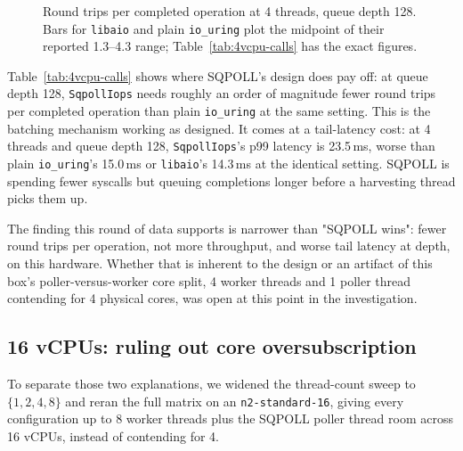 \documentclass[conference]{IEEEtran}
\begin{document}
\begin{figure}[t]
\centering
{}
\caption{Round trips per completed operation at 4 threads, queue depth 128. Bars for
\texttt{libaio} and plain \texttt{io\_uring} plot the midpoint of their reported 1.3--4.3 range;
Table~\ref{tab:4vcpu-calls} has the exact figures.}
\label{fig:calls-per-op}
\end{figure}

Table~\ref{tab:4vcpu-calls} shows where SQPOLL's design does pay off: at queue depth 128,
\texttt{SqpollIops} needs roughly an order of magnitude fewer round trips per completed
operation than plain \texttt{io\_uring} at the same setting. This is the batching mechanism
working as designed. It comes at a tail-latency cost: at 4 threads and queue depth 128,
\texttt{SqpollIops}'s p99 latency is 23.5\,ms, worse than plain \texttt{io\_uring}'s 15.0\,ms or
\texttt{libaio}'s 14.3\,ms at the identical setting. SQPOLL is spending fewer syscalls but
queuing completions longer before a harvesting thread picks them up.

The finding this round of data supports is narrower than "SQPOLL wins": fewer round trips per
operation, not more throughput, and worse tail latency at depth, on this hardware. Whether that
is inherent to the design or an artifact of this box's poller-versus-worker core split, 4 worker
threads and 1 poller thread contending for 4 physical cores, was open at this point in the
investigation.

\subsection{16 vCPUs: ruling out core oversubscription}

To separate those two explanations, we widened the thread-count sweep to $\{1, 2, 4, 8\}$ and
reran the full matrix on an \texttt{n2-standard-16}, giving every configuration up to 8 worker
threads plus the SQPOLL poller thread room across 16 vCPUs, instead of contending for 4.
\end{document}
